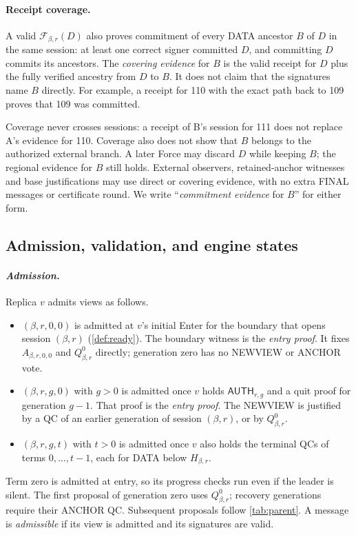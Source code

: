 \documentclass[11pt,a4paper]{article}
\newcommand{\FC}{\mathcal F}
\newcommand{\tagg}[1]{\ensuremath{\mathsf{#1}}}
\newcommand{\defterm}[1]{\textcolor{rrBlue}{\textit{#1}}}
\begin{document}
\paragraph{Receipt coverage.}
\label{sec:coverage}
A valid $\FC_{\beta,r}(D)$ also proves commitment of every DATA ancestor
$B$ of $D$ in the same session: at least one correct signer committed
$D$, and committing $D$ commits its ancestors. The \defterm{covering
evidence} for $B$ is the valid receipt for $D$ plus the fully verified
ancestry from $D$ to $B$. It does not claim that the signatures name $B$
directly. For example, a receipt for 110 with the exact path back to 109
proves that 109 was committed.

Coverage never crosses sessions: a receipt of B's session for 111 does
not replace A's evidence for 110. Coverage also does not show that $B$
belongs to the authorized external branch. A later Force may discard $D$
while keeping $B$; the regional evidence for $B$ still holds. External
observers, retained-anchor witnesses and base justifications may use
direct or covering evidence, with no extra FINAL messages or certificate
round. We write ``\defterm{commitment evidence} for $B$'' for either form.

\subsection{Admission, validation, and engine states}
\label{sec:admission}
\paragraph{\defterm{Admission.}}
Replica $v$ admits views as follows.
\begin{itemize}
\item $(\beta,r,0,0)$ is admitted at $v$'s initial Enter for the boundary
that opens session $(\beta,r)$ (\cref{def:ready}). The boundary witness is
the \defterm{entry proof}. It fixes $A_{\beta,r,0,0}$ and
$Q^0_{\beta,r}$ directly; generation zero has no NEWVIEW or ANCHOR vote.
\item $(\beta,r,g,0)$ with $g>0$ is admitted once $v$ holds
$\tagg{AUTH}_{r,g}$ and a quit proof for generation $g-1$. That proof is
the \defterm{entry proof}. The NEWVIEW is justified by a QC of an earlier
generation of session $(\beta,r)$, or by $Q_{\beta,r}^0$.
\item $(\beta,r,g,t)$ with $t>0$ is admitted once $v$ also holds the
terminal QCs of terms $0,\ldots,t-1$, each for DATA below $H_{\beta,r}$.
\end{itemize}
Term zero is admitted at entry, so its progress checks run even if
the leader is silent. The first proposal of generation zero uses
$Q^0_{\beta,r}$; recovery generations require their ANCHOR QC.
Subsequent proposals follow \cref{tab:parent}. A message is
\defterm{admissible} if its view is admitted and its signatures are valid.
\end{document}

